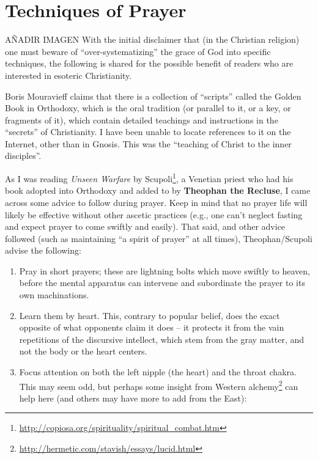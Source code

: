 \section{Techniques of Prayer}

AÑADIR IMAGEN
With the initial disclaimer that (in the Christian religion) one must beware of “over-systematizing” the grace of God into specific techniques, the following is shared for the possible benefit of readers who are interested in esoteric Christianity.

Boris Mouravieff claims that there is a collection of “scripts” called the Golden Book in Orthodoxy, which is the oral tradition (or parallel to it, or a key, or fragments of it), which contain detailed teachings and instructions in the “secrets” of Christianity. I have been unable to locate references to it on the Internet, other than in Gnosis. This was the “teaching of Christ to the inner disciples”.

As I was reading \textit{Unseen Warfare} by Scupoli\footnote{\url{http://copiosa.org/spirituality/spiritual_combat.htm}}, a Venetian priest who had his book adopted into Orthodoxy and added to by \textbf{Theophan the Recluse}, I came across some advice to follow during prayer. Keep in mind that no prayer life will likely be effective without other ascetic practices (e.g., one can’t neglect fasting and expect prayer to come swiftly and easily). That said, and other advice followed (such as maintaining “a spirit of prayer” at all times), Theophan/Scupoli advise the following:

\begin{enumerate}
\item Pray in short prayers; these are lightning bolts which move swiftly to heaven, before the mental apparatus can intervene and subordinate the prayer to its own machinations.

\item Learn them by heart. This, contrary to popular belief, does the exact opposite of what opponents claim it does – it protects it from the vain repetitions of the discursive intellect, which stem from the gray matter, and not the body or the heart centers.

\item Focus attention on both the left nipple (the heart) and the throat chakra. This may seem odd, but perhaps some insight from Western alchemy\footnote{\url{http://hermetic.com/stavish/essays/lucid.html}} can help here (and others may have more to add from the East):

\end{enumerate}

